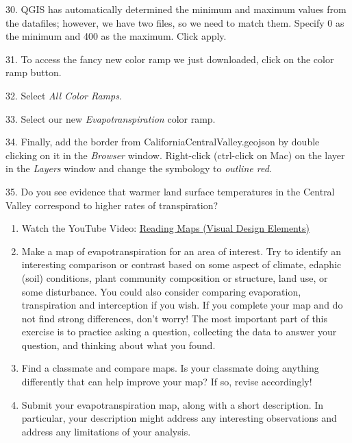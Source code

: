 \documentclass[oneside,a4paper,11pt,explicit]{book}
\begin{document}
30. QGIS has automatically determined the minimum and maximum values from the datafiles; however, we have two files, so we need to match them. Specify 0 as the minimum and 400 as the maximum. Click apply.

31. To access the fancy new color ramp we just downloaded, click on the color ramp button.

32. Select \textit{All Color Ramps}.

33. Select our new \textit{Evapotranspiration} color ramp. 

34. Finally, add the border from CaliforniaCentralValley.geojson by double clicking on it in the \textit{Browser} window. Right-click (ctrl-click on Mac) on the layer in the \textit{Layers} window and change the symbology to \textit{outline red}. 

35. Do you see evidence that warmer land surface temperatures in the Central Valley correspond to higher rates of transpiration?


\begin{tcolorbox}[colback=yellow!5!white,colframe=MACred,title= \vspace{.2em} \Large Make a Map Assignments]
	\large
	\begin{enumerate}
\item Watch the YouTube Video: \href{https://youtu.be/-B6or4KT4Mo?si=UvHIb8aut8uYmglO}{Reading Maps (Visual Design Elements)}

\item Make a map of evapotranspiration for an area of interest. Try to identify an interesting comparison or contrast based on some aspect of climate, edaphic (soil) conditions, plant community composition or structure, land use, or some disturbance. You could also consider comparing evaporation, transpiration and interception if you wish. If you complete your map and do not find strong differences, don’t worry! The most important part of this exercise is to practice asking a question, collecting the data to answer your question, and thinking about what you found.

\item Find a classmate and compare maps. Is your classmate doing anything differently that can help improve your map? If so, revise accordingly!

\item Submit your evapotranspiration map, along with a short description. In particular, your description might address any interesting observations and address any limitations of your analysis.

	\end{enumerate}
\end{tcolorbox}
\end{document}

